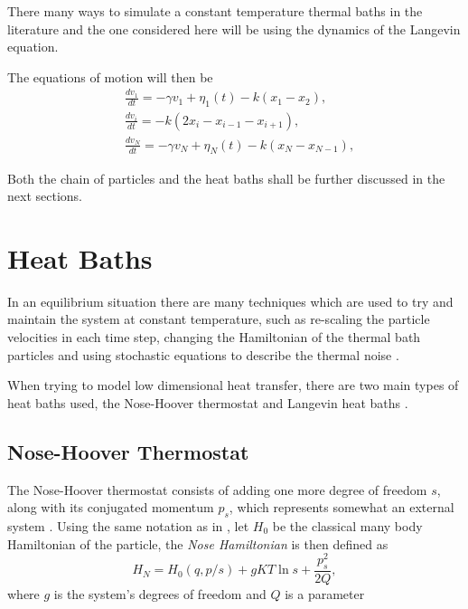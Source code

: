 There many ways to simulate a constant temperature thermal baths in the literature and the one considered here will be using the dynamics of the Langevin equation.

The equations of motion will then be
\begin{equation}\label{eq:1}
	\begin{aligned}
	&\frac{d v_1}{dt} = -\gamma v_1 + \eta_1(t) -k\left(x_1 - x_2\right),\\
	&\frac{d v_i}{dt} = -k\left(2x_i - x_{i-1} - x_{i+1}\right),\\
	&\frac{d v_N}{dt} = -\gamma v_N + \eta_N(t) -k\left(x_N - x_{N-1}\right),
	\end{aligned}
\end{equation}


Both the chain of particles and the heat baths shall be further discussed in the next sections.

\section{Heat Baths}

In an equilibrium situation there are many techniques which are used to try and maintain the system at constant temperature, such as re-scaling the particle velocities in each time step, changing the Hamiltonian of the thermal bath particles \cite{noseUnifiedFormulation1984} and using stochastic equations to describe the thermal noise \cite{lepriThermalConduction2003}.

When trying to model low dimensional heat transfer, there are two main types of heat baths used, the Nose-Hoover thermostat and Langevin heat baths \cite{lepriThermalConduction2003}.

\subsection{Nose-Hoover Thermostat}

The Nose-Hoover thermostat consists of adding one more degree of freedom $ s $, along with its conjugated momentum $ p_{s} $, which represents somewhat an external system \cite{noseUnifiedFormulation1984}. Using the same notation as in \cite{evansNoseHoover1985}, let $ H_{0} $ be the classical many body Hamiltonian of the particle, the \textit{Nose Hamiltonian} is then defined as
\[ H_{N} = H_{0}(q, p/s) + gKT\ln{s} + \frac{p_{s}^{2}}{2Q}, \]
where $ g $ is the system's degrees of freedom and $ Q $ is a parameter 

